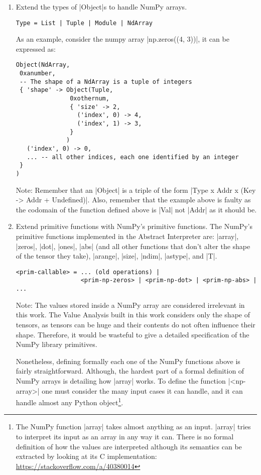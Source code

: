 \begin{enumerate}
\def\labelenumi{\arabic{enumi}.}
\item
  Extend the types of \pycode|Object|s to handle NumPy arrays.

\begin{verbatim}
Type = List | Tuple | Module | NdArray
\end{verbatim}

  As an example, consider the numpy array \pycode|np.zeros((4, 3))|, it
  can be expressed as:

\begin{verbatim}
Object(NdArray,
 0xanumber,
 -- The shape of a NdArray is a tuple of integers
 { 'shape' -> Object(Tuple,
               0xothernum,
               { 'size' -> 2,
                 ('index', 0) -> 4,
                 ('index', 1) -> 3,
               }
              )
   ('index', 0) -> 0,
   ... -- all other indices, each one identified by an integer
 }
)
\end{verbatim}

  Note: Remember that an \pycode|Object| is a triple of the form
  \pycode|Type x Addr x (Key -> Addr + Undefined)|.
  Also, remember that the example above is faulty as the codomain of the
  function defined above is \pycode|Val| not \pycode|Addr| as it should
  be.
\item
  Extend primitive functions with NumPy's primitive functions. The
  NumPy's primitive functions implemented in the Abstract Interpreter
  are: \pycode|array|, \pycode|zeros|, \pycode|dot|, \pycode|ones|,
  \pycode|abs| (and all other functions that don't alter the shape of
  the tensor they take), \pycode|arange|, \pycode|size|, \pycode|ndim|,
  \pycode|astype|, and \pycode|T|.

\begin{verbatim}
<prim-callable> = ... (old operations) |
                  <prim-np-zeros> | <prim-np-dot> | <prim-np-abs> | ...
\end{verbatim}

  Note: The values stored inside a NumPy array are considered irrelevant
  in this work. The Value Analysis built in this work considers only the
  shape of tensors, as tensors can be huge and their contents do not
  often influence their shape. Therefore, it would be wasteful to give a
  detailed specification of the NumPy library primitives.

  Nonetheless, defining formally each one of the NumPy functions above is
  fairly straightforward. Although, the hardest part of a formal
  definition of NumPy arrays is detailing how \pycode|array| works. To
  define the function \pycode|<np-array>| one
  must consider the many input cases it can handle, and it can handle
  almost any Python object\footnote{The NumPy function \pycode|array|
    takes almost anything as an input. \pycode|array| tries to
    interpret its input as an array in any way it can. There is no
    formal definition of how the values are interpreted although its
    semantics can be extracted by looking at its C implementation:
    \url{https://stackoverflow.com/a/40380014}}.


\end{enumerate}
